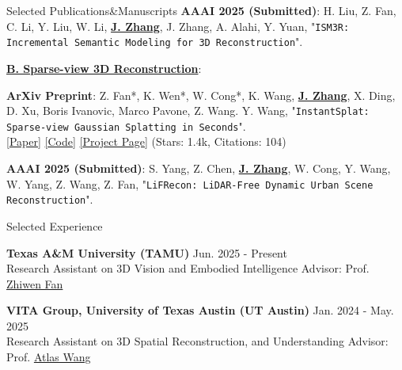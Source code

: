 \documentclass{resume} %
\begin{document}
\begin{rSection}{Selected Publications\&Manuscripts}
{ {\bf AAAI 2025 (Submitted)}}:
H. Liu, Z. Fan, C. Li, Y. Liu, W. Li, \underline{\textbf{J. Zhang}}, J. Zhang, A. Alahi, Y. Yuan,
 "{\texttt{ISM3R: Incremental Semantic Modeling for 3D Reconstruction}}".
\vspace{-1mm}

\textbf{\underline{B. Sparse-view 3D Reconstruction}}:

{ {\bf ArXiv Preprint}}:
Z. Fan*, K. Wen*, W. Cong*, K. Wang, \underline{\textbf{J. Zhang}}, X. Ding, 
D. Xu, Boris Ivanovic, Marco Pavone, Z. Wang. Y. Wang,
 "{\texttt{InstantSplat: Sparse-view Gaussian Splatting in Seconds}}".
\\ \hspace{1em} {\color{BlueViolet} \href{https://arxiv.org/abs/2403.20309}{[\underline{Paper}]} \hspace{1em} \href{https://github.com/NVlabs/InstantSplat}{[\underline{Code}]} \hspace{1em} \href{https://instantsplat.github.io/}{[\underline{Project Page}]}} \hspace{1em} (Stars: 1.4k, Citations: 104)
\vspace{-1mm}

{ {\bf AAAI 2025 (Submitted)}}:
S. Yang, Z. Chen, \underline{\textbf{J. Zhang}}, W. Cong, Y. Wang, W. Yang, Z. Wang, Z. Fan,
 "{\texttt{LiFRecon: LiDAR-Free Dynamic Urban Scene Reconstruction}}".
\vspace{-1mm}
 
\vspace{-1mm}
\end{rSection}

\begin{rSection}{Selected Experience}

\vspace{-0mm}
{ {\bf Texas A\&M University (TAMU)}} \hfill  Jun. 2025 - Present
\\Research Assistant on 3D Vision and Embodied Intelligence \hfill Advisor: Prof. {\color{BlueViolet} \href{https://zhiwenfan.github.io/}{Zhiwen Fan}}

\vspace{-0.5mm}

{ {\bf VITA Group, University of Texas Austin (UT Austin)}
} \hfill  Jan. 2024 - May. 2025
\\Research Assistant on 3D Spatial Reconstruction, and Understanding \hfill Advisor: Prof. {\color{BlueViolet} \href{https://vita-group.github.io/group.html}{Atlas Wang}}

\end{rSection}
\end{document}
